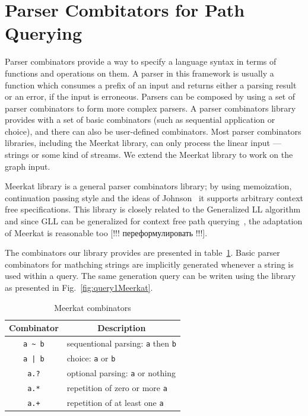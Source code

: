  \section{Parser Combitators for Path Querying}

Parser combinators provide a way to specify a language syntax in terms of functions and operations on them. A parser in this framework is usually a function which consumes a prefix of an input and returns either a parsing result or an error, if the input is erroneous. Parsers can be composed by using a set of parser combinators to form more complex parsers. A parser combinators library provides with a set of basic combinators (such as sequential application or choice), and there can also be user-defined combinators. Most parser combinators libraries, including the Meerkat library, can only process the linear input --- strings or some kind of streams. We extend the Meerkat library to work on the graph input.

Meerkat library is a general parser combinators library; by using memoization, continuation passing style and the ideas of Johnson~\cite{Johnson} it supports arbitrary context free specifications. This library is closely related to the Generalized LL algorithm and since GLL can be generalized for context free path querying~\cite{GrigorevR16}, the adaptation of Meerkat is reasonable too [!!! переформулировать !!!]. 

The combinators our library provides are presented in table~\ref{table:combinators}. Basic parser combinators for mathching strings are implicitly generated whenever a string is used within a query. The same generation query can be writen using the library as presented in Fig.~\ref{fig:query1Meerkat}.

\begin{table}[h]
\centering
\begin{tabular}{c|l}
\multicolumn{1}{c|}{Combinator} & \multicolumn{1}{|c}{Description} \\ \hline
{\lstinline!a ~ b!} & sequentional parsing: {\lstinline!a!} then {\lstinline!b!}   \\
{\lstinline!a | b!} & choice: {\lstinline!a!} or {\lstinline!b!}         \\
{\lstinline!a.?!}   & optional parsing: {\lstinline!a!} or nothing   \\
{\lstinline!a.*!}   & repetition of zero or more {\lstinline!a!} \\
{\lstinline!a.+!}   & repetition of at least one {\lstinline!a!} \\
\end{tabular}
\caption{Meerkat combinators}
\label{table:combinators}
\end{table}


